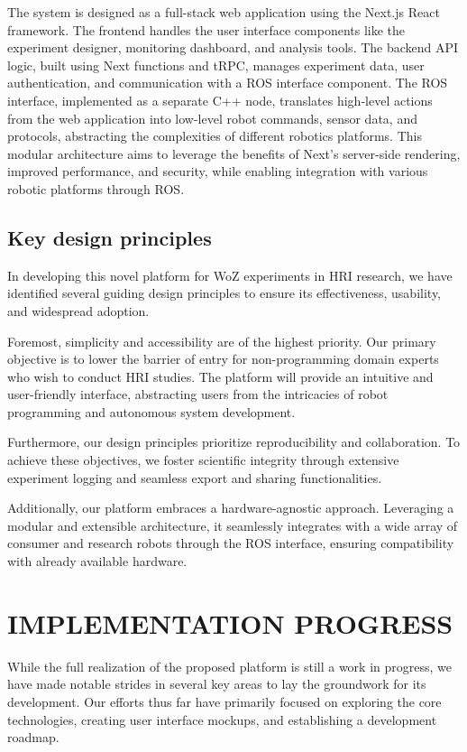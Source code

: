 \documentclass[letterpaper, 10 pt, conference]{ieeeconf}
\begin{document}
The system is designed as a full-stack web application using the Next.js React framework. The frontend handles the user interface components like the experiment designer, monitoring dashboard, and analysis tools. The backend API logic, built using Next functions and tRPC, manages experiment data, user authentication, and communication with a ROS interface component. The ROS interface, implemented as a separate C++ node, translates high-level actions from the web application into low-level robot commands, sensor data, and protocols, abstracting the complexities of different robotics platforms. This modular architecture aims to leverage the benefits of Next's server-side rendering, improved performance, and security, while enabling integration with various robotic platforms through ROS.

\subsection{Key design principles}

In developing this novel platform for WoZ experiments in HRI research, we have identified several guiding design principles to ensure its effectiveness, usability, and widespread adoption.

Foremost, simplicity and accessibility are of the highest priority. Our primary objective is to lower the barrier of entry for non-programming domain experts who wish to conduct HRI studies. The platform will provide an intuitive and user-friendly interface, abstracting users from the intricacies of robot programming and autonomous system development.

Furthermore, our design principles prioritize reproducibility and collaboration. To achieve these objectives, we foster scientific integrity through extensive experiment logging and seamless export and sharing functionalities.

Additionally, our platform embraces a hardware-agnostic approach. Leveraging a modular and extensible architecture, it seamlessly integrates with a wide array of consumer and research robots through the ROS interface, ensuring compatibility with already available hardware.


\section{IMPLEMENTATION PROGRESS}

While the full realization of the proposed platform is still a work in progress, we have made notable strides in several key areas to lay the groundwork for its development. Our efforts thus far have primarily focused on exploring the core technologies, creating user interface mockups, and establishing a development roadmap.
\end{document}
